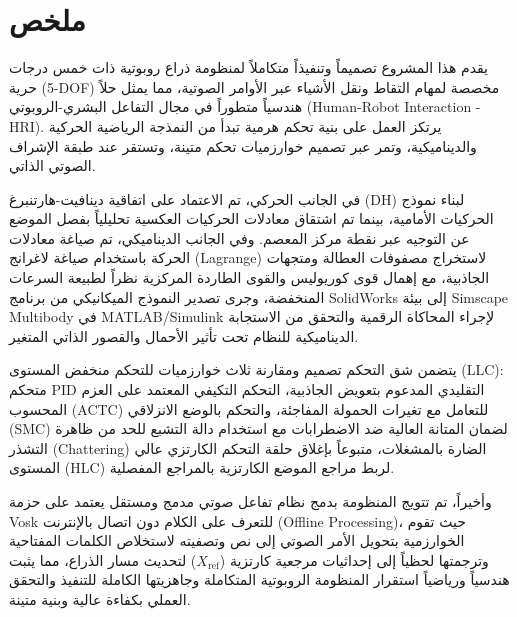 \chapter*{ملخص}
يقدم هذا المشروع تصميماً وتنفيذاً متكاملاً لمنظومة ذراع روبوتية ذات خمس درجات حرية (\textenglish{5-DOF}) مخصصة لمهام التقاط ونقل الأشياء عبر الأوامر الصوتية، مما يمثل حلاً هندسياً متطوراً في مجال التفاعل البشري-الروبوتي (\textenglish{Human-Robot Interaction - HRI}). يرتكز العمل على بنية تحكم هرمية تبدأ من النمذجة الرياضية الحركية والديناميكية، وتمر عبر تصميم خوارزميات تحكم متينة، وتستقر عند طبقة الإشراف الصوتي الذاتي.

في الجانب الحركي، تم الاعتماد على اتفاقية دينافيت-هارتنبرغ (\textenglish{DH}) لبناء نموذج الحركيات الأمامية، بينما تم اشتقاق معادلات الحركيات العكسية تحليلياً بفصل الموضع عن التوجيه عبر نقطة مركز المعصم. وفي الجانب الديناميكي، تم صياغة معادلات الحركة باستخدام صياغة لاغرانج (\textenglish{Lagrange}) لاستخراج مصفوفات العطالة ومتجهات الجاذبية، مع إهمال قوى كوريوليس والقوى الطاردة المركزية نظراً لطبيعة السرعات المنخفضة، وجرى تصدير النموذج الميكانيكي من برنامج \textenglish{SolidWorks} إلى بيئة \textenglish{Simscape Multibody} في \textenglish{MATLAB/Simulink} لإجراء المحاكاة الرقمية والتحقق من الاستجابة الديناميكية للنظام تحت تأثير الأحمال والقصور الذاتي المتغير.

يتضمن شق التحكم تصميم ومقارنة ثلاث خوارزميات للتحكم منخفض المستوى (\textenglish{LLC}): متحكم \textenglish{PID} التقليدي المدعوم بتعويض الجاذبية، التحكم التكيفي المعتمد على العزم المحسوب (\textenglish{ACTC}) للتعامل مع تغيرات الحمولة المفاجئة، والتحكم بالوضع الانزلاقي (\textenglish{SMC}) لضمان المتانة العالية ضد الاضطرابات مع استخدام دالة التشبع للحد من ظاهرة التشذر (\textenglish{Chattering}) الضارة بالمشغلات، متبوعاً بإغلاق حلقة التحكم الكارتزي عالي المستوى (\textenglish{HLC}) لربط مراجع الموضع الكارتزية بالمراجع المفصلية.

وأخيراً، تم تتويج المنظومة بدمج نظام تفاعل صوتي مدمج ومستقل يعتمد على حزمة \textenglish{Vosk} للتعرف على الكلام دون اتصال بالإنترنت (\textenglish{Offline Processing})، حيث تقوم الخوارزمية بتحويل الأمر الصوتي إلى نص وتصفيته لاستخلاص الكلمات المفتاحية وترجمتها لحظياً إلى إحداثيات مرجعية كارتزية ($X_{\text{ref}}$) لتحديث مسار الذراع، مما يثبت هندسياً ورياضياً استقرار المنظومة الروبوتية المتكاملة وجاهزيتها الكاملة للتنفيذ والتحقق العملي بكفاءة عالية وبنية متينة.
